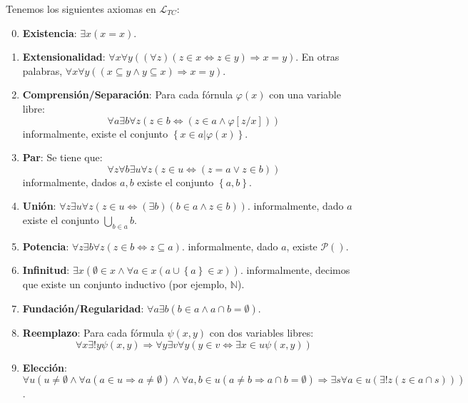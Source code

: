 \documentclass[12pt]{report}
\newcounter{it}
\theoremstyle{largebreak}
\newcommand\pot[1]{\ensuremath{\mathcal{P}\left(#1\right)}}
\begin{document}
    \begin{mydef}
        Tenemos los siguientes axiomas en $\mathcal{L}_{TC}$:
        \begin{enumerate}[label = \textit{(\arabic*)}]
            \setcounter{enumi}{-1}
            \item \textbf{Existencia}: $\exists x(x=x)$.
            \item \textbf{Extensionalidad}: $\forall x\forall y((\forall z)(z\in x\iff z\in y)\Rightarrow x=y)$. En otras palabras, $\forall x\forall y((x\subseteq y\land y\subseteq x)\Rightarrow x=y)$.
            \item \textbf{Comprensión/Separación}: Para cada fórnula $\varphi(x)$ con una variable libre:
            \begin{equation*}
                \forall a\exists b\forall z(z\in b\iff (z\in a\land \varphi[z/x]))
            \end{equation*}
            informalmente, existe el conjunto $\left\{x\in a\Big|\varphi(x) \right\}$.
            \item \textbf{Par}: Se tiene que:
            \begin{equation*}
                \forall z\forall b\exists u\forall z(z\in u\iff(z= a\lor z\in b))
            \end{equation*}
            informalmente, dados $a,b$ existe el conjunto $\left\{a,b\right\}$.
            \item \textbf{Unión}: $\forall z\exists u\forall z(z\in u\iff(\exists b)(b\in a\land z\in b))$.
            informalmente, dado $a$ existe el conjunto $\bigcup_{ b\in a}b$.
            \item \textbf{Potencia}: $\forall z\exists b\forall z(z\in b\iff z\subseteq a)$.
            informalmente, dado $a$, existe $\pot{}$.
            \item \textbf{Infinitud}: $\exists x(\emptyset\in x\land \forall a\in x(a\cup\left\{a \right\}\in x))$.
            informalmente, decimos que existe un conjunto inductivo (por ejemplo, $\mathbb{N}$).
            \item \textbf{Fundación/Regularidad}: $\forall a\exists b(b\in a \land a\cap b=\emptyset)$.
            \item \textbf{Reemplazo}: Para cada fórmula $\psi(x,y)$ con dos variables libres:
            \begin{equation*}
                \forall x\exists!y\psi(x,y)\Rightarrow\forall y\exists v\forall y(y\in v\iff \exists x\in u\psi(x,y))
            \end{equation*}
            \item \textbf{Elección}: $\forall u(u\neq\emptyset\land\forall a(a\in u\Rightarrow a\neq\emptyset)\land \forall a,b\in u(a\neq b\Rightarrow a\cap b=\emptyset)\Rightarrow\exists s\forall a\in u(\exists! z(z\in a\cap s)))$.
        \end{enumerate}
    \end{mydef}
\end{document}
